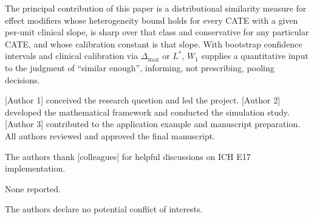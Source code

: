 \documentclass[AMA,Times1COL]{WileyNJDv5}
\begin{document}
The principal contribution of this paper is a distributional similarity measure for effect modifiers whose heterogeneity bound holds for every CATE with a given per-unit clinical slope, is sharp over that class and conservative for any particular CATE, and whose calibration constant is that slope. With bootstrap confidence intervals and clinical calibration via $\Delta_{\max}$ or $L^*$, $W_1$ supplies a quantitative input to the judgment of ``similar enough'', informing, not prescribing, pooling decisions.



[Author 1] conceived the research question and led the project. [Author 2] developed the mathematical framework and conducted the simulation study. [Author 3] contributed to the application example and manuscript preparation. All authors reviewed and approved the final manuscript.


The authors thank [colleagues] for helpful discussions on ICH E17 implementation.


None reported.


The authors declare no potential conflict of interests.

\end{document}
